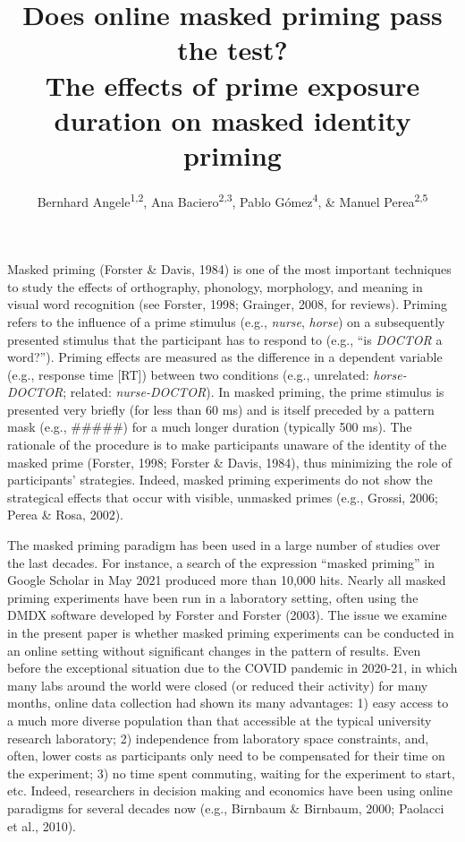 \documentclass[
  english,
  man,floatsintext]{apa6}
\title{Does online masked priming pass the test?\\
The effects of prime exposure duration on masked identity priming}
\author{Bernhard Angele\textsuperscript{1,2}, Ana Baciero\textsuperscript{2,3}, Pablo Gómez\textsuperscript{4}, \& Manuel Perea\textsuperscript{2,5}}
\date{}
\affiliation{\vspace{0.5cm}\textsuperscript{1} Bournemouth University, Bournemouth, UK\\\textsuperscript{2} Centro de Investigación Nebrija en Cognición (CINC), Universidad Nebrija, Madrid, Spain\\\textsuperscript{3} DePaul University, Chicago, USA\\\textsuperscript{4} California State University San Bernardino, Palm Desert Campus, USA\\\textsuperscript{5} Universitat de València, Valencia, Spain}
\begin{document}
\maketitle

Masked priming (Forster \& Davis, 1984) is one of the most important techniques to study the effects of orthography, phonology, morphology, and meaning in visual word recognition (see Forster, 1998; Grainger, 2008, for reviews). Priming refers to the influence of a prime stimulus (e.g., \emph{nurse}, \emph{horse}) on a subsequently presented stimulus that the participant has to respond to (e.g., ``is \emph{DOCTOR} a word?''). Priming effects are measured as the difference in a dependent variable (e.g., response time {[}RT{]}) between two conditions (e.g., unrelated: \emph{horse-DOCTOR}; related: \emph{nurse-DOCTOR}). In masked priming, the prime stimulus is presented very briefly (for less than 60 ms) and is itself preceded by a pattern mask (e.g., \#\#\#\#\#) for a much longer duration (typically 500 ms). The rationale of the procedure is to make participants unaware of the identity of the masked prime (Forster, 1998; Forster \& Davis, 1984), thus minimizing the role of participants' strategies. Indeed, masked priming experiments do not show the strategical effects that occur with visible, unmasked primes (e.g., Grossi, 2006; Perea \& Rosa, 2002).

The masked priming paradigm has been used in a large number of studies over the last decades. For instance, a search of the expression ``masked priming'' in Google Scholar in May 2021 produced more than 10,000 hits. Nearly all masked priming experiments have been run in a laboratory setting, often using the DMDX software developed by Forster and Forster (2003). The issue we examine in the present paper is whether masked priming experiments can be conducted in an online setting without significant changes in the pattern of results. Even before the exceptional situation due to the COVID pandemic in 2020-21, in which many labs around the world were closed (or reduced their activity) for many months, online data collection had shown its many advantages: 1) easy access to a much more diverse population than that accessible at the typical university research laboratory; 2) independence from laboratory space constraints, and, often, lower costs as participants only need to be compensated for their time on the experiment; 3) no time spent commuting, waiting for the experiment to start, etc. Indeed, researchers in decision making and economics have been using online paradigms for several decades now (e.g., Birnbaum \& Birnbaum, 2000; Paolacci et al., 2010).
\end{document}
